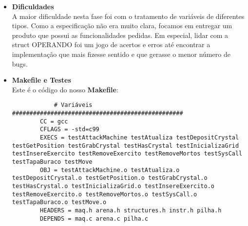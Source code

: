 \documentclass{article}
\begin{document}
\begin{itemize}
    A diferen\c ca principal do c\'odigo da fase anterior est\'a no vetor de instru\c c\~oes prog gerado pelo montador. Como adaptamos o tipo operando, o montador agora verifica de que tipo \'e o comando da linha especificada e acrescenta uma dire\c c\~ao \textit{default} ou um inteiro \textit{default}:
    
    \begin{lstlisting}
    INSTR prog[] = {
    
    
      {NUM, PUSH, { 9, WEST }},
      {NUM, CALL, { 4, WEST }},
      {NUM, PRN, { 0, WEST }},
      {NUM, END, { 0, WEST }},
      {NUM, ALC, { 1, WEST }},
      {NUM, DUP, { 0, WEST }},
      {NUM, STL, { 0, WEST }},
      {NUM, PUSH, { 1, WEST }},
      {NUM, EQ, { 0, WEST }},
      {NUM, JIF, { 13, WEST }},
      {NUM, PUSH, { 1, WEST }},
      {NUM, FRE, { 1, WEST }},
      {NUM, RET, { 0, WEST }},
      {NUM, RCE, { 0, WEST }},
      {NUM, PUSH, { 1, WEST }},
      {NUM, SUB, { 0, WEST }},
      {NUM, CALL, { 4, WEST }},
      {NUM, RCE, { 0, WEST }},
      {NUM, MUL, { 0, WEST }},
      {NUM, FRE, { 1, WEST }},
      {NUM, RET, { 0, WEST }},
    
    };
    
    \end{lstlisting}
    
    \item \textbf{Dificuldades} \\
    A maior dificuldade nesta fase foi com o tratamento de vari\'aveis de diferentes tipos. Como a especifica\c c\~ao n\~ao era muito clara, focamos em entregar um produto que possui as funcionalidades pedidas. Em especial, lidar com a struct OPERANDO foi um jogo de acertos e erros at\'e encontrar a implementa\c c\~ao que mais fizesse sentido e que gerasse o menor n\'umero de bugs. 
    
    \item \textbf{Makefile e Testes} \\
    Este \'e o c\'odigo do nosso \textbf{Makefile}:
    \begin{lstlisting}
            # Variáveis #################################################
        CC = gcc
        CFLAGS = -std=c99
        EXECS = testAttackMachine testAtualiza testDepositCrystal testGetPosition testGrabCrystal testHasCrystal testInicializaGrid testInsereExercito testRemoveExercito testRemoveMortos testSysCall testTapaBuraco testMove
        OBJ = testAttackMachine.o testAtualiza.o testDepositCrystal.o testGetPosition.o testGrabCrystal.o testHasCrystal.o testInicializaGrid.o testInsereExercito.o testRemoveExercito.o testRemoveMortos.o testSysCall.o testTapaBuraco.o testMove.o
        HEADERS = maq.h arena.h structures.h instr.h pilha.h
        DEPENDS = maq.c arena.c pilha.c
        

\end{lstlisting}
\end{itemize}
\end{document}
